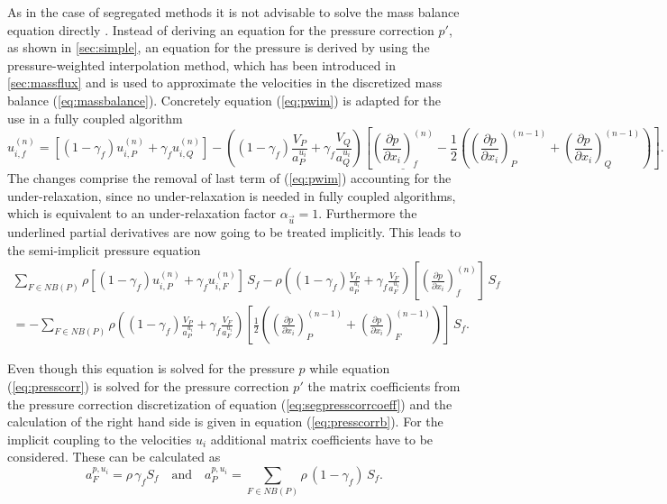 As in the case of segregated methods it is not advisable to solve the mass balance equation directly \cite{schaefer99}. Instead of deriving an equation for the pressure correction \(p'\), as shown in \ref{sec:simple}, an equation for the pressure is derived by using the pressure-weighted interpolation method, which has been introduced in \ref{sec:massflux} and is used to approximate the velocities in the discretized mass balance (\ref{eq:massbalance}). Concretely equation (\ref{eq:pwim}) is adapted for the use in a fully coupled algorithm
\begin{displaymath}
  u_{i,f}^{(n)} 
  =
  \left[\left(1 - \gamma_f\right) u_{i,P}^{(n)} + \gamma_f u_{i,Q}^{(n)} \right]
  - \left(\left(1 - \gamma_f\right) \frac{V_P}{a_P^{u_i}} + \gamma_f \frac{ V_Q}{a_Q^{u_i}}\right)
  \left[ 
    \underline{ \left(\frac{\partial p}{\partial x_i}\right)_f^{(n)}}
  - \frac{1}{2} 
  \left( 
    \left( \frac{\partial p}{\partial x_i} \right)_P^{(n-1)} 
  + \left(\frac{\partial p}{\partial x_i}\right)_Q^{(n-1)} 
  \right)
  \right].
\end{displaymath}
The changes comprise the removal of last term of (\ref{eq:pwim}) accounting for the under-relaxation, since no under-relaxation is needed in fully coupled algorithms, which is equivalent to an under-relaxation factor \(\alpha_\vec{u} = 1\). Furthermore the underlined partial derivatives are now going to be treated implicitly. This leads to the semi-implicit pressure equation
\begin{align}
  \sum_{F \in NB(P)} 
  \rho
  \left[\left(1 - \gamma_f\right) u_{i,P}^{(n)} + \gamma_f u_{i,F}^{(n)} \right]\,  S_f
  - \rho \left(\left(1 - \gamma_f\right) \frac{ V_P}{a_P^{u_i}} + \gamma_f \frac{ V_F}{a_F^{u_i}}\right)
  \left[ 
  \left(\frac{\partial p}{\partial x_i}\right)_f^{(n)}
  \right]\,  S_f \nonumber \\
  =
  - \sum_{F \in NB(P)}
  \rho
  \left(\left(1 - \gamma_f\right) \frac{ V_P}{a_P^{u_i}} + \gamma_f \frac{ V_F}{a_F^{u_i}}\right)
  \left[ 
  \frac{1}{2} 
  \left( 
    \left( \frac{\partial p}{\partial x_i} \right)_P^{(n-1)} 
  + \left(\frac{\partial p}{\partial x_i}\right)_F^{(n-1)} 
  \right)
  \right] \, S_f.
\end{align}

Even though this equation is solved for the pressure \(p\) while equation (\ref{eq:presscorr}) is solved for the pressure correction \(p'\) the matrix coefficients from the pressure correction discretization of equation (\ref{eq:segpresscorrcoeff}) and the calculation of the right hand side is given in equation (\ref{eq:presscorrb}). For the implicit coupling to the velocities \(u_i\) additional matrix coefficients have to be considered. These can be calculated as
\begin{displaymath}
  a_F^{p,u_i} = \rho \, \gamma_f S_f \quad \text{and} \quad a_P^{p,u_i} = \sum_{F \in NB(P)} \rho \, (1-\gamma_f) \, S_f.
\end{displaymath}

